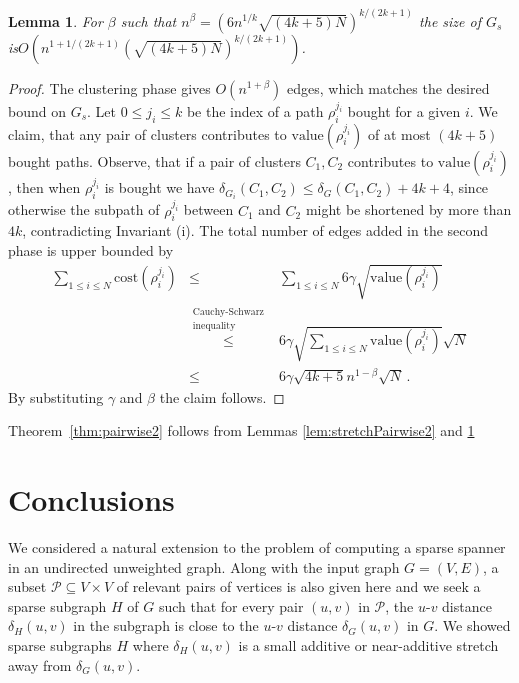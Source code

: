 \documentclass[a4paper,11pt]{article}
\newtheorem{lemma}{Lemma}[section]
\theoremstyle{definition}
\newcommand{\dist}{\delta}
\newcommand{\cost}{\mathrm{cost}}
\newcommand{\val}{\mathrm{value}}
\newcommand{\cP}{\mathcal{P}}
\begin{document}
\begin{lemma}\label{lem:sizePairwise2}
For $\beta$ such that $n^{\beta}=(6n^{1/k} \sqrt{(4k+5)N})^{k/(2k+1)}$ the
size of $G_s$ is\newline $O(n^{1+1/(2k+1)}(\sqrt{(4k+5)N})^{k/(2k+1)})$.
\end{lemma}

\begin{proof}
The clustering phase gives $O(n^{1+\beta})$ edges, 
which matches the desired bound on $G_s$.
Let $0 \le j_i \le k$ be the index of a path $\rho_i^{j_i}$ bought for a given $i$.
We claim, that any pair of clusters contributes 
to $\val(\rho_i^{j_i})$ of at most $(4k+5)$ bought paths.
Observe, that if a pair of clusters $C_1,C_2$ contributes to $\val(\rho_i^{j_i})$,
then when $\rho_i^{j_i}$ is bought we have
$\dist_{G_i}(C_1,C_2) \le \dist_G(C_1,C_2)+4k+4$, since otherwise
the subpath of $\rho_i^{j_i}$ between $C_1$ and $C_2$ might be shortened 
by more than $4k$, contradicting Invariant (i).
The total number of edges added in the second phase is upper bounded by 
\begin{eqnarray*}
\sum_{1 \le i \le N} \cost(\rho_i^{j_i}) & \le & \sum_{1 \le i \le N} 6\gamma\sqrt{\val(\rho_i^{j_i})} \\
   & \overset{\substack{\text{Cauchy-Schwarz}\\\text{inequality}}}{\le} & 6\gamma \sqrt{\sum_{1 \le i \le N}\val(\rho_i^{j_i})} \sqrt{N} \\
  & \le & 6\gamma \sqrt{4k+5} n^{1-\beta} \sqrt{N}\,.
\end{eqnarray*}
By substituting $\gamma$ and $\beta$ the claim follows.
\end{proof}

Theorem~\ref{thm:pairwise2} follows from Lemmas \ref{lem:stretchPairwise2} and \ref{lem:sizePairwise2}


\section{Conclusions}

We considered a natural extension to the problem of computing a sparse spanner in an undirected unweighted graph. Along with the input
graph $G = (V,E)$,  a subset $\cP \subseteq V\times V$ of relevant pairs
of vertices is also given here and we seek a sparse subgraph $H$ of $G$ 
such that for every 
pair $(u,v)$ in $\cP$, the $u$-$v$ distance $\dist_H(u,v)$ in the subgraph is close to the 
$u$-$v$ distance $\dist_{G}(u,v)$ in $G$. We showed sparse subgraphs $H$ where $\delta_H(u,v)$ is a small additive or near-additive stretch away from $\delta_G(u,v)$. 
\end{document}
